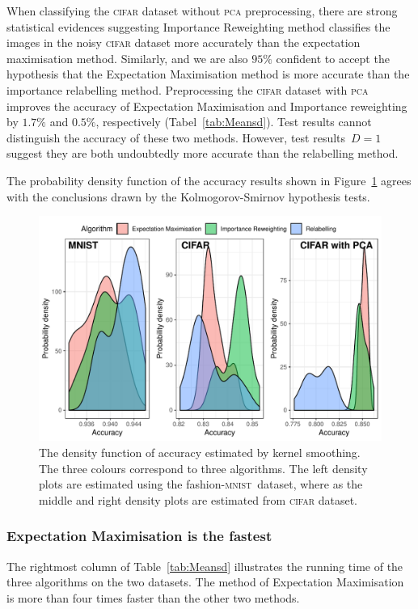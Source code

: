\documentclass[12pt]{article} %
\newcommand{\mnist}{fashion-\textsc{mnist}}
\begin{document}
When classifying the \textsc{cifar} dataset without \textsc{pca} preprocessing, there are strong statistical evidences suggesting Importance Reweighting method classifies the images in the noisy \textsc{cifar} dataset more accurately than the expectation maximisation method. Similarly, and we are also $95\%$ confident to accept the hypothesis that the Expectation Maximisation method is more accurate than the importance relabelling method. Preprocessing  the \textsc{cifar} dataset with \textsc{pca} improves the accuracy of Expectation Maximisation and Importance reweighting by $1.7\%$ and $0.5\%$, respectively (Tabel~\ref{tab:Meansd}). Test results cannot distinguish the accuracy of these two methods. However, test results~$D=1$ suggest they are both undoubtedly more accurate than the relabelling method.

The probability density function of the accuracy results shown in Figure~\ref{fig:Density} agrees with the conclusions drawn by the Kolmogorov-Smirnov hypothesis tests.
\begin{figure}
    \centering
	\includegraphics[scale=0.8]{histo}
	\caption{The density function of accuracy estimated by kernel smoothing. The three colours correspond to three algorithms. The left density plots are estimated using the \mnist\ dataset, where as the middle and right density plots are estimated from \textsc{cifar} dataset.}
	\label{fig:Density}
\end{figure}


\subsubsection{Expectation Maximisation is the fastest}
The rightmost column of Table~\ref{tab:Meansd} illustrates the running time of the three algorithms on the two datasets.
The method of Expectation Maximisation is more than four times faster than the other two methods.
\end{document}
